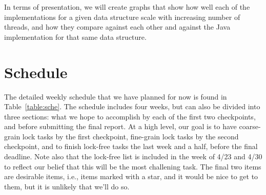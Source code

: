 \documentclass[11pt]{article}
\begin{document}
In terms of presentation, we will create graphs that show how well each of the
implementations for a given data structure scale with increasing number of
threads, and how they compare against each other and against the Java
implementation for that same data structure.

\section*{Schedule}
The detailed weekly schedule that we have planned for now is found in
Table~\ref{table:sche}. The schedule includes four weeks, but can also be
divided into three sections: what we hope to accomplish by each of the first two
checkpoints, and before submitting the final report. At a high level, our goal
is to have coarse-grain lock tasks by the first checkpoint, fine-grain lock
tasks by the second checkpoint, and to finish lock-free tasks the last week and
a half, before the final deadline. Note also that the lock-free list is included
in the week of 4/23 and 4/30 to reflect our belief that this will be the most
challening task. The final two items are desirable items, i.e., items marked
with a star, and it would be nice to get to them, but it is unlikely that we'll
do so.
\end{document}
